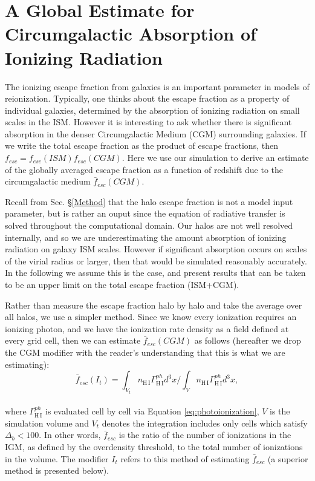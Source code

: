 \section{A Global Estimate for Circumgalactic Absorption of Ionizing Radiation}
\label{escape}

The ionizing escape fraction from galaxies is an important parameter in models of reionization. Typically, one thinks about the escape fraction as a property of individual galaxies, determined by the absorption of ionizing radiation on small scales in the ISM. However it is interesting to ask whether there is significant absorption in the denser Circumgalactic Medium (CGM) surrounding galaxies. If we write the total escape fraction as the product of escape fractions, then $f_{esc}=f_{esc}(ISM)f_{esc}(CGM)$.  Here we use our simulation to derive an estimate of the globally averaged escape fraction as a function of redshift  due to the circumgalactic medium $\bar{f}_{esc}(CGM)$. 

Recall from Sec. \S\ref{Method} that the halo escape fraction is not a model input parameter, but is rather an ouput since the equation of radiative transfer is solved throughout the computational domain. Our halos are not well resolved internally, and so we are underestimating the amount absorption of ionizing radiation on galaxy ISM scales. However if significant absorption  occurs on scales of the virial radius or larger, then that would be simulated reasonably accurately. In the following we assume this is the case, and present results that can be taken to be an upper limit on the total escape fraction (ISM+CGM). 

Rather than measure the escape fraction halo by halo and take the average over all halos, we use a simpler method. Since we know every ionization requires an ionizing photon, and we have the ionization rate density as a field defined at every grid cell, then we can estimate $\bar{f}_{esc}(CGM)$ as follows (hereafter we drop the CGM modifier with the reader's understanding that this is what we are estimating):
\begin{equation}
\bar{f}_{esc}(I_t) = \int_{V_t}  n_\mathrm{H\,I}\Gamma_\mathrm{H\,I}^{ph} d^3x \bigg / \int_{V}  n_\mathrm{H\,I}\Gamma_\mathrm{H\,I}^{ph} d^3x  ,
\label{eq:fesc}
\end{equation}
\\where $\Gamma_\mathrm{H\,I}^{ph}$ is evaluated cell by cell via Equation \eqref{eq:photoionization}, $V$ is the simulation volume and $V_t$ denotes the integration includes only cells which satisfy $\Delta_b < 100.$ In other words, $\bar{f}_{esc}$ is the ratio of the number of ionizations in the IGM, as defined by the overdensity threshold, to the total number of ionizations in the volume. The modifier $I_t$ refers to this method of estimating $\bar{f}_{esc}$ (a superior method is presented below).



